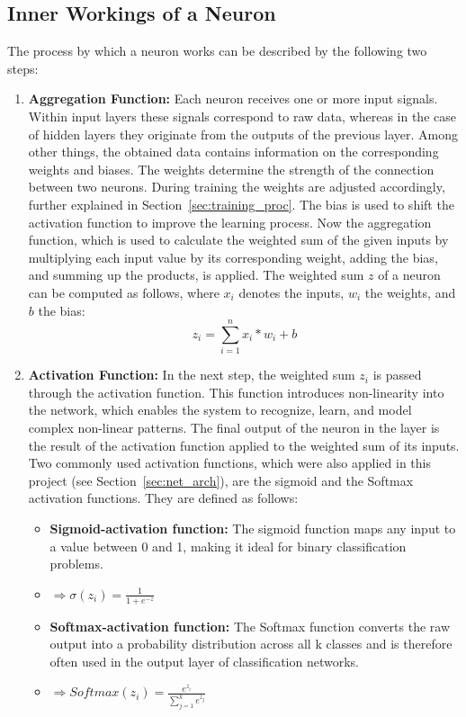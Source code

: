 \documentclass[12pt,fleqn,a4paper]{article}
\begin{document}
\subsection{Inner Workings of a Neuron}
The process by which a neuron works can be described by the following two steps:
 \begin{enumerate}
 \item \textbf{Aggregation Function:} Each neuron receives one or more input signals. Within input layers these signals correspond to raw data, whereas in the case of hidden layers they originate from the outputs of the previous layer. Among other things, the obtained data contains information on the corresponding weights and biases. The weights determine the strength of the connection between two neurons. During training the weights are adjusted accordingly, further explained in Section~\ref{sec:training_proc}. The bias is used to shift the activation function to improve the learning process. 
Now the aggregation function, which is used to calculate the weighted sum of the given inputs by multiplying each input value by its corresponding weight, adding the bias, and summing up the products, is applied. The weighted sum $z$ of a neuron can be computed as follows, where $x_i$ denotes the inputs, $w_i$ the weights, and $b$ the bias: \\
$$z_i = \sum_{i=1}^n x_i* w_i +b$$

 \item \textbf{Activation Function:} In the next step, the weighted sum $z_i$ is passed through the activation function. This function introduces non-linearity into the network, which enables the system to recognize, learn, and model complex non-linear patterns. The final output of the neuron in the layer is the result of the activation function applied to the weighted sum of its inputs. Two commonly used activation functions, which were also applied in this project (see Section~\ref{sec:net_arch}), are the sigmoid and the Softmax activation functions. They are defined as follows:
\begin{itemize}
\item \textbf{Sigmoid-activation function:} The sigmoid function maps any input to a value between 0 and 1, making it ideal for binary classification problems. 
\item[]\hspace{1.25cm}$\Rightarrow \sigma(z_i)=\frac{1}{1+e^{-z}}$

\item \textbf{Softmax-activation function:} The Softmax function converts the raw output into a probability distribution across all k classes and is therefore often used in the output layer of classification networks.
\item[]\hspace{1.25cm}$\Rightarrow Softmax(z_i)=\frac{e^{z_i}}{\sum_{j=1}^{k} e^{z_j}}$
\end{itemize}
\end{enumerate}
\end{document}
